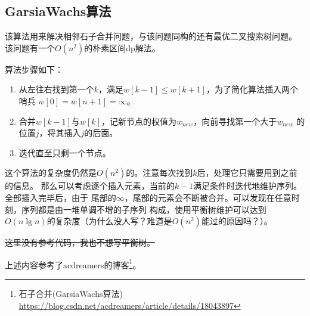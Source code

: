 \subsection{GarsiaWachs算法}
该算法用来解决相邻石子合并问题，与该问题同构的还有最优二叉搜索树问题。
该问题有一个$O(n^2)$的朴素区间dp解法。

算法步骤如下：
\begin{enumerate}
    \item 从左往右找到第一个$k$，满足$w[k-1] \leq w[k+1]$，为了简化算法插入两个哨兵
    $w[0]=w[n+1]=\infty$。
    \item 合并$w[k-1]$与$w[k]$，记新节点的权值为$w_{new}$，向前寻找第一个大于$w_{new}$
    的位置$j$，将其插入$j$的后面。
    \item 迭代直至只剩一个节点。
\end{enumerate}

这个算法的复杂度仍然是$O(n^2)$的。注意每次找到$k$后，处理它只需要用到之前的信息。
那么可以考虑逐个插入元素，当前的$k-1$满足条件时迭代地维护序列。全部插入完毕后，由于
尾部的$\infty$，尾部的元素会不断被合并。可以发现在任意时刻，序列都是由一堆单调不增的子序列
构成，使用平衡树维护可以达到$O(n\lg n)$的复杂度（为什么没人写？难道是$O(n^2)$能过的原因吗？）。

\sout{这里没有参考代码，我也不想写平衡树。}

上述内容参考了acdreamers的博客\footnote{
    石子合并(GarsiaWachs算法)\\
    \url{https://blog.csdn.net/acdreamers/article/details/18043897}
}。
